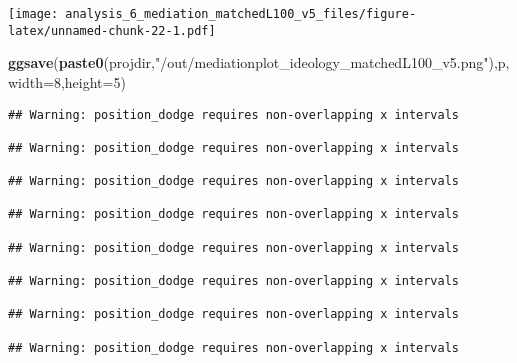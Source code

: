 \documentclass[
]{article}
\newenvironment{Shaded}{\begin{snugshade}}{\end{snugshade}}
\newcommand{\DataTypeTok}[1]{\textcolor[rgb]{0.13,0.29,0.53}{#1}}
\newcommand{\DecValTok}[1]{\textcolor[rgb]{0.00,0.00,0.81}{#1}}
\newcommand{\KeywordTok}[1]{\textcolor[rgb]{0.13,0.29,0.53}{\textbf{#1}}}
\newcommand{\NormalTok}[1]{#1}
\newcommand{\StringTok}[1]{\textcolor[rgb]{0.31,0.60,0.02}{#1}}
\begin{document}
\texttt{[image: analysis\_6\_mediation\_matchedL100\_v5\_files/figure-latex/unnamed-chunk-22-1.pdf]}

\begin{Shaded}
\begin{Highlighting}[]
\KeywordTok{ggsave}\NormalTok{(}\KeywordTok{paste0}\NormalTok{(projdir,}\StringTok{"/out/mediationplot_ideology_matchedL100_v5.png"}\NormalTok{),p,}\DataTypeTok{width=}\DecValTok{8}\NormalTok{,}\DataTypeTok{height=}\DecValTok{5}\NormalTok{)}
\end{Highlighting}
\end{Shaded}

\begin{verbatim}
## Warning: position_dodge requires non-overlapping x intervals

## Warning: position_dodge requires non-overlapping x intervals

## Warning: position_dodge requires non-overlapping x intervals

## Warning: position_dodge requires non-overlapping x intervals

## Warning: position_dodge requires non-overlapping x intervals

## Warning: position_dodge requires non-overlapping x intervals

## Warning: position_dodge requires non-overlapping x intervals

## Warning: position_dodge requires non-overlapping x intervals
\end{verbatim}
\end{document}
